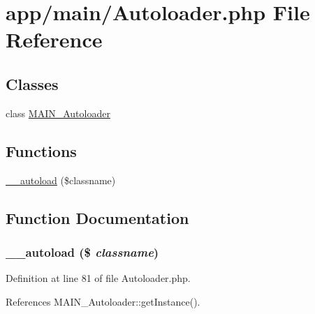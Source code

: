 \hypertarget{Autoloader_8php}{
\section{app/main/Autoloader.php File Reference}
\label{dc/df3/Autoloader_8php}
}
\subsection*{Classes}
\begin{DoxyCompactItemize}
\item 
class \hyperlink{classMAIN__Autoloader}{MAIN\_\-Autoloader}
\end{DoxyCompactItemize}
\subsection*{Functions}
\begin{DoxyCompactItemize}
\item 
\hyperlink{Autoloader_8php_a0be872cd5a9e883ce56599451b1e5e25}{\_\-\_\-autoload} (\$classname)
\end{DoxyCompactItemize}


\subsection{Function Documentation}
\hypertarget{Autoloader_8php_a0be872cd5a9e883ce56599451b1e5e25}{
\subsubsection[{\_\-\_\-autoload}]{\setlength{\rightskip}{0pt plus 5cm}\_\-\_\-autoload (\$ {\em classname})}}
\label{dc/df3/Autoloader_8php_a0be872cd5a9e883ce56599451b1e5e25}


Definition at line 81 of file Autoloader.php.

References MAIN\_\-Autoloader::getInstance().